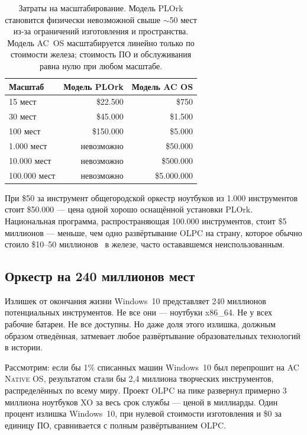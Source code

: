 \documentclass[10pt,letterpaper,twocolumn]{article}
\newcommand{\acos}{\textsc{AC Native OS}}
\begin{document}
\begin{table}[h]
\small
\centering
\begin{tabular}{lrr}
\toprule
\textbf{Масштаб} & \textbf{Модель PLOrk} & \textbf{Модель AC OS} \\
\midrule
15 мест & \$22.500 & \$750 \\
30 мест & \$45.000 & \$1.500 \\
100 мест & \$150.000 & \$5.000 \\
1.000 мест & невозможно & \$50.000 \\
10.000 мест & невозможно & \$500.000 \\
100.000 мест & невозможно & \$5.000.000 \\
\bottomrule
\end{tabular}
\caption{Затраты на масштабирование. Модель PLOrk становится физически невозможной свыше $\sim$50 мест из-за ограничений изготовления и пространства. Модель AC~OS масштабируется линейно только по стоимости железа; стоимость ПО и обслуживания равна нулю при любом масштабе.}
\label{tab:scaling}
\end{table}

При \$50 за инструмент общегородской оркестр ноутбуков из 1.000 инструментов стоит \$50.000 --- цена одной хорошо оснащённой установки PLOrk. Национальная программа, распространяющая 100.000 инструментов, стоит \$5 миллионов --- меньше, чем одно развёртывание OLPC на страну, которое обычно стоило \$10--50 миллионов~\citep{kraemer2009olpc} в железе, часто остававшемся неиспользованным.

\subsection{Оркестр на 240 миллионов мест}

Излишек от окончания жизни Windows~10 представляет 240 миллионов потенциальных инструментов. Не все они --- ноутбуки x86\_64. Не у всех рабочие батареи. Не все доступны. Но даже доля этого излишка, должным образом отведённая, затмевает любое развёртывание образовательных технологий в истории.

Рассмотрим: если бы 1\% списанных машин Windows~10 был перепрошит на \acos{}, результатом стали бы 2,4 миллиона творческих инструментов, распределённых по всему миру. Проект OLPC на пике развернул примерно 3 миллиона ноутбуков XO за весь срок службы --- ценой в миллиарды. Один процент излишка Windows~10, при нулевой стоимости изготовления и \$0 за единицу ПО, сравнивается с полным развёртыванием OLPC.
\end{document}
